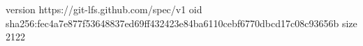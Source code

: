version https://git-lfs.github.com/spec/v1
oid sha256:fec4a7e877f53648837ed69ff432423e84ba6110cebf6770dbcd17c08c93656b
size 2122
